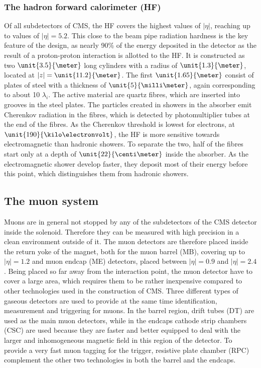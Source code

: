 \subsubsection*{The hadron forward calorimeter (HF)}
Of all subdetectors of CMS, the HF covers the highest values of $\vert\eta\vert$, reaching up to values of $\vert\eta\vert = 5.2$. This close to the beam pipe radiation hardness is the key feature of the design, as nearly 90\% of the energy deposited in the detector as the result of a proton-proton interaction is allotted to the HF. It is constructed as two $\unit{3.5}{\meter}$ long cylinders with a radius of $\unit{1.3}{\meter}$, located at $\vert z \vert = \unit{11.2}{\meter}$. The first $\unit{1.65}{\meter}$ consist of plates of steel with a thickness of $\unit{5}{\milli\meter}$, again corresponding to about 10 $\lambda_i$. The active material are quartz fibres, which are inserted into grooves in the steel plates. The particles created in showers in the absorber emit Cherenkov radiation in the fibres, which is detected by photomultiplier tubes at the end of the fibres. As the Cherenkov threshold is lowest for electrons, at $\unit{190}{\kilo\electronvolt}$, the HF is more sensitive towards electromagnetic than hadronic showers. To separate the two, half of the fibres start only at a depth of $\unit{22}{\centi\meter}$ inside the absorber. As the electromagnetic shower develop faster, they deposit most of their energy before this point, which distinguishes them from hadronic showers. 	     
\subsection{The muon system} 
Muons are in general not stopped by any of the subdetectors of the CMS detector inside the solenoid. Therefore they can be measured with high precision in a clean environment outside of it. The muon detectors are therefore placed inside the return yoke of the magnet, both for the muon barrel (MB), covering up to $\vert\eta\vert = 1.2$ and muon endcap (ME) detectors, placed between $\vert\eta\vert = 0.9$ and $\vert\eta\vert = 2.4$. Being placed so far away from the interaction point, the muon detector have to cover a large area, which requires them to be rather inexpensive compared to other technologies used in the construction of CMS. Three different types of gaseous detectors are used to provide at the same time identification, \pt measurement and triggering for muons. In the barrel region, drift tubes (DT) are used as the main muon detectors, while in the endcaps cathode strip chambers (CSC) are used because they are faster and better equipped to deal with the larger and inhomogeneous magnetic field in this region of the detector. To provide a very fast muon tagging for the trigger, resistive plate chamber (RPC) complement the other two technologies in both the barrel and the endcaps. 
